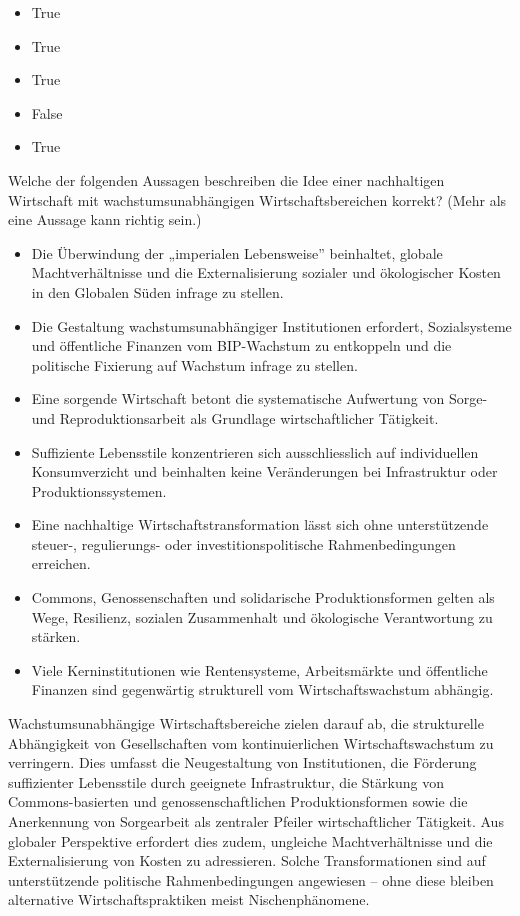 \documentclass[
  nswissgerman,
  a4paper,
  openany]{book}
\providecommand{\tightlist}{%
  \setlength{\itemsep}{0pt}\setlength{\parskip}{0pt}}
\begin{document}
\begin{itemize}
\tightlist
\item
  True
\item
  True
\item
  True
\item
  False
\item
  True
\end{itemize}

Welche der folgenden Aussagen beschreiben die Idee einer nachhaltigen
Wirtschaft mit wachstumsunabhängigen Wirtschaftsbereichen korrekt? (Mehr
als eine Aussage kann richtig sein.)

\begin{itemize}
\tightlist
\item[$\square$]
  Die Überwindung der „imperialen Lebensweise'' beinhaltet, globale
  Machtverhältnisse und die Externalisierung sozialer und ökologischer
  Kosten in den Globalen Süden infrage zu stellen.
\item[$\square$]
  Die Gestaltung wachstumsunabhängiger Institutionen erfordert,
  Sozialsysteme und öffentliche Finanzen vom BIP-Wachstum zu entkoppeln
  und die politische Fixierung auf Wachstum infrage zu stellen.
\item[$\square$]
  Eine sorgende Wirtschaft betont die systematische Aufwertung von
  Sorge- und Reproduktionsarbeit als Grundlage wirtschaftlicher
  Tätigkeit.
\item[$\square$]
  Suffiziente Lebensstile konzentrieren sich ausschliesslich auf
  individuellen Konsumverzicht und beinhalten keine Veränderungen bei
  Infrastruktur oder Produktionssystemen.
\item[$\square$]
  Eine nachhaltige Wirtschaftstransformation lässt sich ohne
  unterstützende steuer-, regulierungs- oder investitionspolitische
  Rahmenbedingungen erreichen.
\item[$\square$]
  Commons, Genossenschaften und solidarische Produktionsformen gelten
  als Wege, Resilienz, sozialen Zusammenhalt und ökologische
  Verantwortung zu stärken.
\item[$\square$]
  Viele Kerninstitutionen wie Rentensysteme, Arbeitsmärkte und
  öffentliche Finanzen sind gegenwärtig strukturell vom
  Wirtschaftswachstum abhängig.
\end{itemize}

Wachstumsunabhängige Wirtschaftsbereiche zielen darauf ab, die
strukturelle Abhängigkeit von Gesellschaften vom kontinuierlichen
Wirtschaftswachstum zu verringern. Dies umfasst die Neugestaltung von
Institutionen, die Förderung suffizienter Lebensstile durch geeignete
Infrastruktur, die Stärkung von Commons-basierten und
genossenschaftlichen Produktionsformen sowie die Anerkennung von
Sorgearbeit als zentraler Pfeiler wirtschaftlicher Tätigkeit. Aus
globaler Perspektive erfordert dies zudem, ungleiche Machtverhältnisse
und die Externalisierung von Kosten zu adressieren. Solche
Transformationen sind auf unterstützende politische Rahmenbedingungen
angewiesen -- ohne diese bleiben alternative Wirtschaftspraktiken meist
Nischenphänomene.
\end{document}
